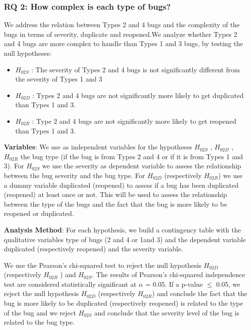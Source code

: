 \subsubsection{RQ 2: How complex is each type of bugs?}

We address the relation between Types 2 and 4 bugs and
the complexity of the bugs in terms of severity, duplicate and
reopened.We analyze whether Types 2 and 4 bugs are more
complex to handle than Types 1 and 3 bugs, by testing the
null hypotheses:

\begin{itemize}
 \item  $H_{02S}$ : The severity of Types 2 and 4 bugs is not
significantly different from the severity of Types 1 and 3
 \item  $H_{02D}$ : Types 2 and 4 bugs are not significantly more
likely to get duplicated than Types 1 and 3.
 \item  $H_{02R}$ : Type 2 and 4 bugs are not significantly more
likely to get reopened than Types 1 and 3.
\end{itemize}

{\bf Variables}: We use as independent variables for the
hypotheses $H_{02S}$ , $H_{02D}$ , $H_{02R}$ the bug type (if the bug is from
Types 2 and 4 or if it is from Types 1 and 3). For $H_{02S}$  we use
the severity as dependent variable to assess the relationship
between the bug severity and the bug type. For $H_{02D}$ 
(respectively $H_{02R}$) we use a dummy variable duplicated
(reopened) to assess if a bug has been duplicated (reopened)
at least once or not. This will be used to assess the
relationship between the type of the bugs and the fact that the
bug is more likely to be reopened or duplicated.

{\bf Analysis Method}: For each hypothesis, we build a
contingency table with the qualitative variables type of bugs
(2 and 4 or 1and 3) and the dependent variable duplicated
(respectively reopened) and the severity variable.

We use the Pearson’s chi-squared test to reject the null
hypothesis $H_{02D}$ (respectively $H_{02R}$ ) and $H_{02S}$. The results of
Pearson’s chi-squared independence test are considered
statistically significant at $\alpha$ = 0.05. If a p-value $\le$ 0.05, we
reject the null hypothesis  $H_{02D}$ (respectively $H_{02R}$) and
conclude the fact that the bug is more likely to be duplicated
(respectively reopened) is related to the type of the bug and
we reject $H_{02S}$ and conclude that the severity level of the bug
is related to the bug type.

